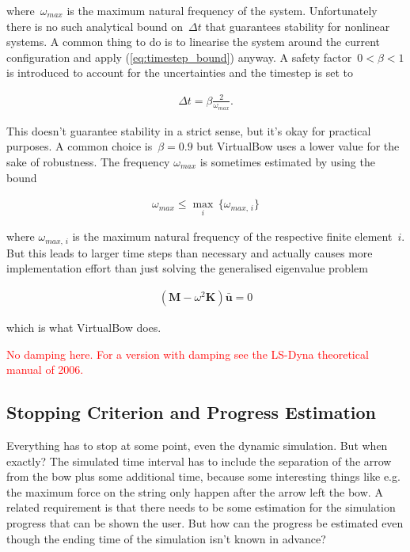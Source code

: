 where~$\omega_{max}$ is the maximum natural frequency \cite{bib:dynamic_solution} of the system.
Unfortunately there is no such analytical bound on~$\Delta t$ that guarantees stability for nonlinear systems.
A common thing to do is to linearise the system around the current configuration and apply (\ref{eq:timestep_bound}) anyway.
A safety factor~$0 < \beta < 1$ is introduced to account for the uncertainties and the timestep is set to

\begin{align}
\Delta t = \beta \frac{2}{\omega_{max}}.
\end{align}

This doesn't guarantee stability in a strict sense, but it's okay for practical purposes. A common choice is~$\beta = 0.9$ but VirtualBow uses a lower value for the sake of robustness. The frequency $\omega_{max}$ is sometimes estimated by using the bound

\begin{align}
\omega_{max} \le \max_{i}\,\{\omega_{max,\,i}\}
\end{align}

where $\omega_{max,\,i}$ is the maximum natural frequency of the respective finite element~$i$. But this leads to larger time steps than necessary and actually causes more implementation effort than just solving the generalised eigenvalue problem

\begin{align}
\left(\boldsymbol{M} - \omega^2\boldsymbol{K}\right)\boldsymbol{\bar{u}} = 0\label{eq:natural_frequencies}
\end{align}

which is what VirtualBow does.

\textcolor{red}{No damping here. For a version with damping see the LS-Dyna theoretical manual of 2006.}

\subsection{Stopping Criterion and Progress Estimation}

Everything has to stop at some point, even the dynamic simulation. But when exactly?
The simulated time interval has to include the separation of the arrow from the bow plus some additional time, because some interesting things like e.g. the maximum force on the string only happen after the arrow left the bow.
A related requirement is that there needs to be some estimation for the simulation progress that can be shown the user.
But how can the progress be estimated even though the ending time of the simulation isn't known in advance?

